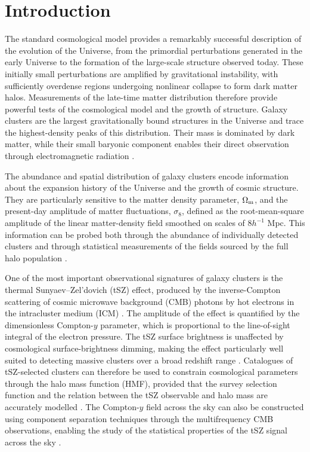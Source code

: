 \documentclass[aps,prd,twocolumn,superscriptaddress,nofootinbib,floatfix]{revtex4-2}
\begin{document}
 
\maketitle

\section{Introduction}
\label{sec:intro}
The standard cosmological model provides a remarkably successful description of the evolution of the Universe, from the primordial perturbations generated in the early Universe to the formation of the large-scale structure observed today. These initially small perturbations are amplified by gravitational instability, with sufficiently overdense regions undergoing nonlinear collapse to form dark matter halos. Measurements of the late-time matter distribution therefore provide powerful tests of the cosmological model and the growth of structure. Galaxy clusters are the largest gravitationally bound structures in the Universe and trace the highest-density peaks of this distribution. Their mass is dominated by dark matter, while their small baryonic component enables their direct observation through electromagnetic radiation \citep{Allen2011}.

The abundance and spatial distribution of galaxy clusters encode information about the expansion history of the Universe and the growth of cosmic structure. They are particularly sensitive to the matter density parameter, $\Omega_{\rm m}$, and the present-day amplitude of matter fluctuations, $\sigma_8$, defined as the root-mean-square amplitude of the linear matter-density field smoothed on scales of $8h^{-1}$ Mpc. This information can be probed both through the abundance of individually detected clusters and through statistical measurements of the fields sourced by the full halo population \citep{Allen2011,Planck2015XXIV}.

One of the most important observational signatures of galaxy clusters is the thermal Sunyaev--Zel'dovich (tSZ) effect, produced by the inverse-Compton scattering of cosmic microwave background (CMB) photons by hot electrons in the intracluster medium (ICM) \citep{SunyaevZeldovich1972,Carlstrom2002}. The amplitude of the effect is quantified by the dimensionless Compton-$y$ parameter, which is proportional to the line-of-sight integral of the electron pressure. The tSZ surface brightness is unaffected by cosmological surface-brightness dimming, making the effect particularly well suited to detecting massive clusters over a broad redshift range \citep{Carlstrom2002}. Catalogues of tSZ-selected clusters can therefore be used to constrain cosmological parameters through the halo mass function (HMF), provided that the survey selection function and the relation between the tSZ observable and halo mass are accurately modelled \citep{Planck2015XXIV}. The Compton-$y$ field across the sky can also be constructed using component separation techniques through the multifrequency CMB observations, enabling the study of the statistical properties of the tSZ signal across the sky \citep{Planck2015XXII}.
\end{document}
